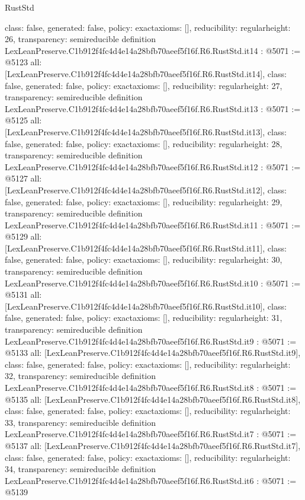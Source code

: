 \begin{lexlean}{RustStd}
\begin{coremodule}
{  class: false,
  generated: false,
  policy: exact{axioms: []},
  reducibility: regular{height: 26},
  transparency: semireducible
}
definition LexLeanPreserve.C1b912f4fc4d4e14a28bfb70aeef5f16f.R6.RustStd.it14 : @5071 := @5123 {
  all: [LexLeanPreserve.C1b912f4fc4d4e14a28bfb70aeef5f16f.R6.RustStd.it14],
  class: false,
  generated: false,
  policy: exact{axioms: []},
  reducibility: regular{height: 27},
  transparency: semireducible
}
definition LexLeanPreserve.C1b912f4fc4d4e14a28bfb70aeef5f16f.R6.RustStd.it13 : @5071 := @5125 {
  all: [LexLeanPreserve.C1b912f4fc4d4e14a28bfb70aeef5f16f.R6.RustStd.it13],
  class: false,
  generated: false,
  policy: exact{axioms: []},
  reducibility: regular{height: 28},
  transparency: semireducible
}
definition LexLeanPreserve.C1b912f4fc4d4e14a28bfb70aeef5f16f.R6.RustStd.it12 : @5071 := @5127 {
  all: [LexLeanPreserve.C1b912f4fc4d4e14a28bfb70aeef5f16f.R6.RustStd.it12],
  class: false,
  generated: false,
  policy: exact{axioms: []},
  reducibility: regular{height: 29},
  transparency: semireducible
}
definition LexLeanPreserve.C1b912f4fc4d4e14a28bfb70aeef5f16f.R6.RustStd.it11 : @5071 := @5129 {
  all: [LexLeanPreserve.C1b912f4fc4d4e14a28bfb70aeef5f16f.R6.RustStd.it11],
  class: false,
  generated: false,
  policy: exact{axioms: []},
  reducibility: regular{height: 30},
  transparency: semireducible
}
definition LexLeanPreserve.C1b912f4fc4d4e14a28bfb70aeef5f16f.R6.RustStd.it10 : @5071 := @5131 {
  all: [LexLeanPreserve.C1b912f4fc4d4e14a28bfb70aeef5f16f.R6.RustStd.it10],
  class: false,
  generated: false,
  policy: exact{axioms: []},
  reducibility: regular{height: 31},
  transparency: semireducible
}
definition LexLeanPreserve.C1b912f4fc4d4e14a28bfb70aeef5f16f.R6.RustStd.it9 : @5071 := @5133 {
  all: [LexLeanPreserve.C1b912f4fc4d4e14a28bfb70aeef5f16f.R6.RustStd.it9],
  class: false,
  generated: false,
  policy: exact{axioms: []},
  reducibility: regular{height: 32},
  transparency: semireducible
}
definition LexLeanPreserve.C1b912f4fc4d4e14a28bfb70aeef5f16f.R6.RustStd.it8 : @5071 := @5135 {
  all: [LexLeanPreserve.C1b912f4fc4d4e14a28bfb70aeef5f16f.R6.RustStd.it8],
  class: false,
  generated: false,
  policy: exact{axioms: []},
  reducibility: regular{height: 33},
  transparency: semireducible
}
definition LexLeanPreserve.C1b912f4fc4d4e14a28bfb70aeef5f16f.R6.RustStd.it7 : @5071 := @5137 {
  all: [LexLeanPreserve.C1b912f4fc4d4e14a28bfb70aeef5f16f.R6.RustStd.it7],
  class: false,
  generated: false,
  policy: exact{axioms: []},
  reducibility: regular{height: 34},
  transparency: semireducible
}
definition LexLeanPreserve.C1b912f4fc4d4e14a28bfb70aeef5f16f.R6.RustStd.it6 : @5071 := @5139 {
}
\end{coremodule}
\end{lexlean}
